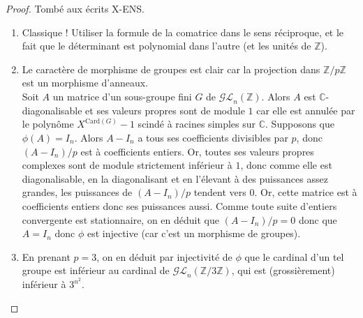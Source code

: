 \documentclass[french,a4paper]{article}
\newcommand{\Z}{\mathbb{Z}}
\newcommand{\C}{\mathbb{C}}
\newcommand{\card}{\text{Card}}
\theoremstyle{plain}
\theoremstyle{definition}
\theoremstyle{remark}
\begin{document}
\begin{proof}
	Tombé aux écrits X-ENS.
	\begin{enumerate}
		\item Classique ! Utiliser la formule de la comatrice dans le sens réciproque, et le fait que le déterminant est polynomial dans l'autre (et les unités de $\Z$).
		\item Le caractère de morphisme de groupes est clair car la projection dans $\Z/p\Z$ est un morphisme d'anneaux. \\ Soit $A$ un matrice d'un sous-groupe fini $G$ de $\mathcal{GL}_n(\Z)$. Alors $A$ est $\C$-diagonalisable et ses valeurs propres sont de module $1$ car elle est annulée par le polynôme $X^{\card(G)}-1$ scindé à racines simples sur $\C$. Supposons que $\phi(A)=I_n$. Alors $A-I_n$ a tous ses coefficients divisibles par $p$, donc $(A-I_n)/p$ est à coefficients entiers. Or, toutes ses valeurs propres complexes sont de module strictement inférieur à $1$, donc comme elle est diagonalisable, en la diagonalisant et en l'élevant à des puissances assez grandes, les puissances de $(A-I_n)/p$ tendent vers $0$. Or, cette matrice est à coefficients entiers donc ses puissances aussi. Comme toute suite d'entiers convergente est stationnaire, on en déduit que $(A-I_n)/p=0$ donc que $A=I_n$ donc $\phi$ est injective (car c'est un morphisme de groupes).
		\item En prenant $p=3$, on en déduit par injectivité de $\phi$ que le cardinal d'un tel groupe est inférieur au cardinal de $\mathcal{GL}_n(\Z/3\Z)$, qui est (grossièrement) inférieur à $3^{n^2}$.
	\end{enumerate}
\end{proof}
\end{document}
